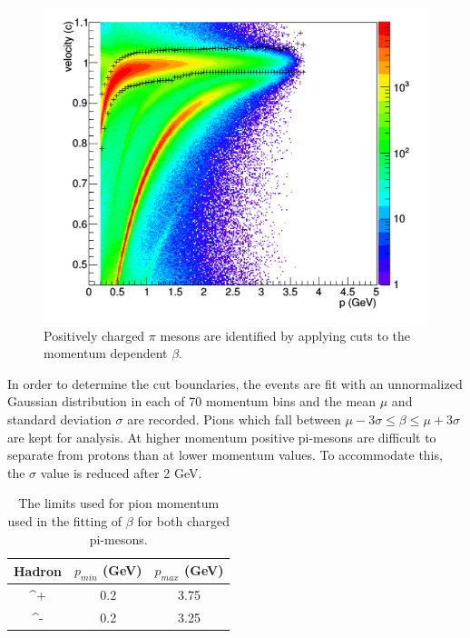 \begin{figure}
  \centering
  \includegraphics[width=\textwidth]{image/plots/sidis/nathan-pip.png}
  \caption[PID for $\pi^+$ used for the SIDIS analysis]{Positively charged $\pi$ mesons are identified by applying cuts to the momentum dependent $\beta$.}
\end{figure}

In order to determine the cut boundaries, the events are fit with an unnormalized Gaussian distribution in each of 70 momentum bins and the mean $\mu$ and standard deviation $\sigma$ are recorded.  Pions which fall between $\mu - 3\sigma \leq \beta \leq \mu + 3 \sigma$ are kept for analysis.  At higher momentum positive pi-mesons are difficult to separate from protons than at lower momentum values.  To accommodate this, the $\sigma$ value is reduced after 2 GeV.  \\

\begin{table}
	\label{table:hadron-id-nathan}
  \centering
  \begin{tabular}{c|c|c}
    Hadron & $p_{min}$ (GeV) & $p_{max}$ (GeV) \\
    \hline 
	\pi^+ & 0.2 & 3.75 \\
	\pi^- & 0.2 & 3.25 \\
  \end{tabular}
  \caption[Limits for pion momentum used in fitting $\beta$.]{The limits used for pion momentum used in the fitting of $\beta$ for both charged pi-mesons.}
\end{table} 
 
